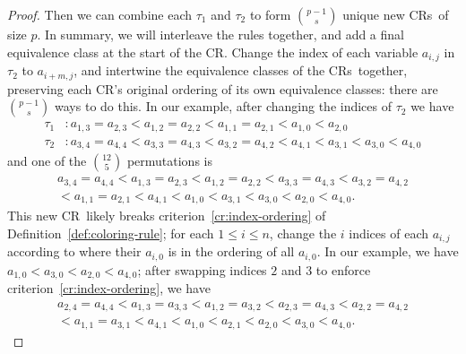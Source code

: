 \documentclass[11pt]{article}
\newcommand{\crulenospace}{CR}
\newcommand{\crule}{\crulenospace~}
\newcommand{\crules}{\crulenospace s~}
\newcommand{\numpoints}{n}
\newcommand{\inumpoints}{i}
\newcommand{\idegr}{j}
\newcommand{\commonconst}{a}
\theoremstyle{plain}
\theoremstyle{definition}
\begin{document}
\begin{proof}
Then we can combine each $\tau_1$ and $\tau_2$ to form $\binom{p-1}{s}$ unique new \crules of size $p$.
In summary, we will interleave the rules together, and add a final equivalence class at the start of
the \crulenospace.
Change the index of each variable $\commonconst_{\inumpoints,\idegr}$ in $\tau_2$ to $\commonconst_{\inumpoints+m,\idegr}$, and intertwine the equivalence classes of the \crules together, preserving each \crulenospace's original ordering of its own equivalence classes: there are $\binom{p-1}{s}$ ways to do this. In our example, after changing the indices of $\tau_2$ we have \begin{align*}
\tau_1 & \colon \commonconst_{1,3} = \commonconst_{2,3} < \commonconst_{1,2} = \commonconst_{2,2} < \commonconst_{1,1} = \commonconst_{2,1} < \commonconst_{1,0} < \commonconst_{2,0}\\
\tau_2 & \colon \commonconst_{3,4} = \commonconst_{4,4} < \commonconst_{3,3} = \commonconst_{4,3} < \commonconst_{3,2} = \commonconst_{4,2} < \commonconst_{4,1} < \commonconst_{3,1} < \commonconst_{3,0} < \commonconst_{4,0}
\end{align*} and one of the $\binom{12}{5}$ permutations is \begin{align*}
\commonconst_{3,4} = \commonconst_{4,4} < \commonconst_{1,3} = \commonconst_{2,3} < \commonconst_{1,2} = \commonconst_{2,2} < \commonconst_{3,3} = \commonconst_{4,3} < \commonconst_{3,2} = \commonconst_{4,2} \\ < \commonconst_{1,1} = \commonconst_{2,1} < \commonconst_{4,1} < \commonconst_{1,0} < \commonconst_{3,1} < \commonconst_{3,0} < \commonconst_{2,0} < \commonconst_{4,0}.
\end{align*}This new \crule likely breaks criterion~\ref{cr:index-ordering} of Definition~\ref{def:coloring-rule}; for each $1 \leq \inumpoints \leq \numpoints$, change the $i$ indices of each $\commonconst_{\inumpoints,\idegr}$ according to where their $\commonconst_{\inumpoints,0}$ is in the ordering of all $\commonconst_{i,0}$. In our example, we have $\commonconst_{1,0} < \commonconst_{3,0} < \commonconst_{2,0} < \commonconst_{4,0}$; after swapping indices $2$ and $3$ to enforce criterion~\ref{cr:index-ordering}, we have \begin{align*}
\commonconst_{2,4} = \commonconst_{4,4} < \commonconst_{1,3} = \commonconst_{3,3} < \commonconst_{1,2} = \commonconst_{3,2} < \commonconst_{2,3} = \commonconst_{4,3} < \commonconst_{2,2} = \commonconst_{4,2} \\ < \commonconst_{1,1} = \commonconst_{3,1} < \commonconst_{4,1} < \commonconst_{1,0} < \commonconst_{2,1} < \commonconst_{2,0} < \commonconst_{3,0} < \commonconst_{4,0}.
\end{align*}


\end{proof}
\end{document}
